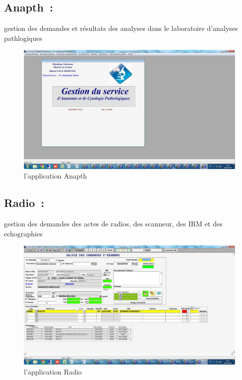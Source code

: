 \documentclass[12pt]{rapportINPTCLOUD}
\begin{document}
\subsection{Anapth :} gestion des demandes et résultats des analyses dans le laboratoire d’analyses pathlogiques 
\begin{figure}[H]
	\centering
	\includegraphics[width=1\linewidth]{img/i.jpg}
	\caption{l'application Anapth}
	\label{fig:Anapth}
\end{figure}

\subsection{Radio :}   gestion des demandes des actes de radios, des scanneur, des IRM et des echographies
\begin{figure}[H]
	\centering
	\includegraphics[width=1\linewidth]{img/j.jpg}
	\caption{l'application Radio}
	\label{fig:Radio}
\end{figure}
\end{document}
